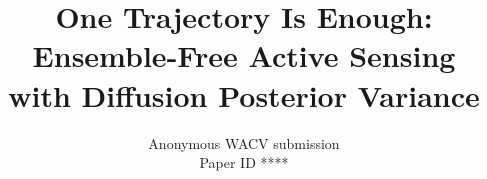 \documentclass[10pt,twocolumn,letterpaper]{article}
\def\wacvPaperID{****} %
\begin{document}
\title{One Trajectory Is Enough: Ensemble-Free Active Sensing\\
       with Diffusion Posterior Variance}
\author{Anonymous WACV submission\\Paper ID \wacvPaperID}
\maketitle








{\small


}
\end{document}
